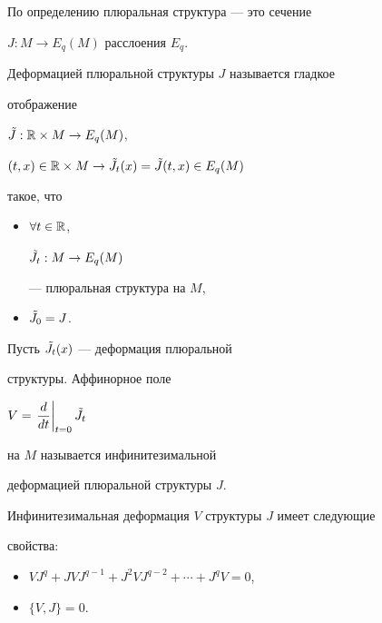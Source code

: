 По определению плюральная структура --- это сечение


$J: M \to E_{q}(M)$  расслоения  $E_{q}$.





\begin{defn}


Деформацией плюральной структуры $J$ называется гладкое


отображение


$\Tilde J : {\Bbb R} \times M \to E_{q}(M)$,


$(t,x) \in {\Bbb R} \times M \to \Tilde J_{t}(x) =


\Tilde J(t,x) \in E_{q}(M)$


такое, что


\begin{itemize}


\item[1)] $\forall t \in {\Bbb R}$,


$\Tilde J_{t} : M \to E_{q}(M) $


--- плюральная структура на $M$,


\item[2)] $\Tilde J_{0} = J$.


\end{itemize}


\end{defn}





\begin{defn}


Пусть $\Tilde J_{t}(x) $ --- деформация плюральной


структуры. Аффинорное поле


$V =\left. \dfrac{d}{dt} \right|_{t=0} \Tilde J_{t}$


на $M$ называется инфинитезимальной


деформацией плюральной структуры $J$.


\end{defn}





\begin{assrt}


Инфинитезимальная деформация $V$ структуры $J$ имеет следующие


свойства:


\begin{itemize}


\item[1)] $VJ^{q}+JVJ^{q-1}+J^{2}VJ^{q-2}+\dotsb +J^{q}V=0 $,


\item[2)] $\{V, J\} = 0$.      \label{propert}


\end{itemize}


\end{assrt}





